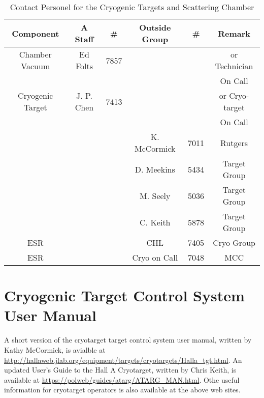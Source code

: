 \vspace{0.3cm} { \centering 
\begin{table}
\begin{tabular}{|c|c|c|c|c|c|}
\hline 
Component &
 A Staff&
 \#&
 Outside Group&
 \#&
 Remark\\
\hline 
Chamber Vacuum&
 Ed Folts&
 7857&
&
&
 or Technician \\
&
&
&
&
&
 On Call\\
\hline 
Cryogenic Target &
J. P. Chen
&7413 &
&
&
 or Cryo-target \\
&
&
&
&
&
On Call 
\\
\hline 
&
&
&
 K. McCormick&
 7011&
 Rutgers\\
\hline 
&
&
&
 D. Meekins&
 5434&
 Target Group\\
\hline 
&
&
&
 M. Seely&
 5036&
 Target Group\\
\hline 
&
&
&
 C. Keith&
 5878&
 Target Group\\
\hline 
ESR&
&
&
 CHL&
 7405&
 Cryo Group\\
\hline 
ESR&
&
&
 Cryo on Call&
 7048&MCC
\\
\hline 
\end{tabular}
\label{tab:tarper}

\caption{Contact Personel for the Cryogenic Targets and Scattering Chamber}
\end{table}
}

\par{} \vspace{0.3cm}

\newpage
\section[Cryogenic Target Control System User Manual]
{Cryogenic Target Control System User Manual 
}
A short version of 
the cryotarget target control system user manual, written by Kathy 
McCormick, is avialble at
\url{http://hallaweb.jlab.org/equipment/targets/cryotargets/Halla_tgt.html}.
An updated User's Guide to the Hall A Cryotarget, written by Chris Keith,
is available at \url{https://polweb/guides/atarg/ATARG_MAN.html}.  Othe useful
information for cryotarget operators 
is also available at the above web sites.



